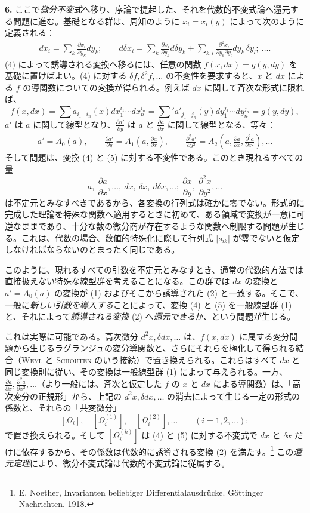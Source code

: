 \documentclass[11pt]{article}
\newcommand{\srcnumdisplay}[2]{\begin{equation*}\tag*{#1}\begin{aligned}#2\end{aligned}\end{equation*}}
\begin{document}
\textbf{6.} ここで\emph{微分不変式}へ移り、序論で提起した、それを代数的不変式論へ還元する問題に進む。基礎となる群は、周知のように $x_i=x_i(y)$ によって次のように定義される：
\srcnumdisplay{(4)}{d x_i=\sum_k \frac{\partial x_i}{\partial y_k}d y_k;\qquad
 d\delta x_i=\sum_k \frac{\partial x_i}{\partial y_k}d\delta y_k+
\sum_{k,l}\frac{\partial^2 x_i}{\partial y_k\partial y_l}d y_k\,\delta y_l;\ \ldots .}
(4) によって誘導される変換へ移るには、任意の関数 $f(x,d x)=g(y,d y)$ を基礎に置けばよい。(4) に対する $\delta f,\delta^2f,\ldots$ の不変性を要求すると、$x$ と $d x$ による $f$ の導関数についての変換が得られる。例えば $d x$ に関して斉次な形式に限れば、
\[
 f(x,d x)=\sum a_{i_1\ldots i_n}(x)d x_1^{i_1}\cdots d x_n^{i_n}
 =\sum{}' a'_{j_1\ldots j_n}(y)d y_1^{j_1}\cdots d y_n^{j_n}
 =g(y,d y),
\]
$a'$ は $a$ に関して線型となり、$\frac{\partial a'}{\partial y}$ は $a$ と $\frac{\partial a}{\partial x}$ に関して線型となる、等々：
\srcnumdisplay{(5)}{a'=A_0(a),\qquad
\frac{\partial a'}{\partial y}=A_1\!\left(a,\frac{\partial a}{\partial x}\right),\qquad
\frac{\partial^2 a'}{\partial y^2}=A_2\!\left(a,\frac{\partial a}{\partial x},\frac{\partial^2 a}{\partial x^2}\right),\ldots}
そして問題は、変換 (4) と (5) に対する不変性である。このとき現れるすべての量
\[
a,\ \frac{\partial a}{\partial x},\ldots,\ d x,\ \delta x,\ d\delta x,\ldots;\ 
\frac{\partial x}{\partial y},\ \frac{\partial^2 x}{\partial y^2},\ldots
\]
は不定元とみなすべきであるから、各変換の行列式は確かに零でない。形式的に完成した理論を特殊な関数へ適用するときに初めて、ある領域で変換が一意に可逆なままであり、十分な数の微分商が存在するような関数へ制限する問題が生じる。これは、代数の場合、数値的特殊化に際して行列式 $|s_{ik}|$ が零でないと仮定しなければならないのとまったく同じである。

このように、現れるすべての引数を不定元とみなすとき、通常の代数的方法では直接扱えない特殊な線型群を考えることになる。この群では $d x$ の変換と $a'=A_0(a)$ の変換が (1) およびそこから誘導された (2) と一致する。そこで、一般に\emph{新しい引数を導入する}ことによって、変換 (4) と (5) を一般線型群 (1) と、それによって\emph{誘導される変換} (2) へ\emph{還元できる}か、という問題が生じる。

これは実際に可能である。高次微分 $d^2x,\delta d x,\ldots$ は、$f(x,d x)$ に属する変分問題から生じるラグランジ\nolinebreak[4]ュの変分導関数と、さらにそれらを極化して得られる結合（\textsc{Weyl} と \textsc{Schouten} のいう接続）で置き換えられる。これらはすべて $d x$ と同じ変換則に従い、その変換は一般線型群 (1) によって与えられる。一方、$\frac{\partial a}{\partial x},\frac{\partial^2a}{\partial x^2},\ldots$（より一般には、斉次と仮定した $f$ の $x$ と $d x$ による導関数）は、「高次変分の正規形」から、上記の $d^2x,\delta d x,\ldots$ の消去によって生じる一定の形式の係数と、それらの「共変微分」
\[
 [\Omega_i],\quad [\Omega_i^{(1)}],\quad [\Omega_i^{(2)}],\ldots\qquad (i=1,2,\ldots);
\]
で置き換えられる。そして $[\Omega_i^{(k)}]$ は (4) と (5) に対する不変式で $d x$ と $\delta x$ だけに依存するから、その係数は代数的に誘導される変換 (2) を満たす。\footnote{E. Noether, Invarianten beliebiger Differentialausdrücke. Göttinger Nachrichten. 1918.} この\emph{還元定理}により、微分不変式論は代数的不変式論に従属する。
\end{document}
